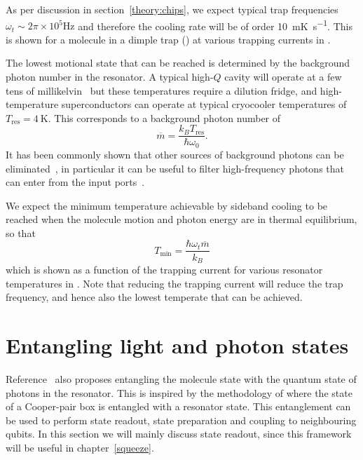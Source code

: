 As per discussion in section~\ref{theory:chips}, we expect typical trap
frequencies $\omega_t\sim 2\pi \times 10^5 \si{\hertz}$ and therefore the
cooling rate will be of order \SI{10}{\milli\kelvin\per\second}. This is shown
for a molecule in a dimple trap () at various trapping currents in
.

The lowest motional state that can be reached is determined by the background
photon number in the resonator. A typical high-$Q$ cavity will operate at a few
tens of millikelvin~\cite{doi:10.1063/1.3010859} but these temperatures require
a dilution fridge, and high-temperature superconductors can operate at typical
cryocooler temperatures of $T_\text{res}=\SI{4}{\kelvin}$. This corresponds
to a background photon number of
%
\begin{equation}
  \overline{m} = \frac{k_B T_\text{res}}{\hbar \omega_0}.
\end{equation}
%
It has been commonly shown that other sources of background photons can be
eliminated~\cite{Wallraff2004}, in particular it can be useful to filter
high-frequency photons that can enter from the input
ports~\cite{doi:10.1063/1.3638063}. 

We expect the minimum temperature achievable by sideband cooling to be reached
when the molecule motion and photon energy are in thermal equilibrium, so that
%
\begin{equation}
  T_\text{min} = \frac{\hbar \omega_t \overline{m}}{k_B}
\end{equation}
%
which is shown as a function of the trapping current for various resonator
temperatures in . Note that reducing the
trapping current will reduce the trap frequency, and hence also the lowest
temperate that can be achieved. 

\section{Entangling light and photon states}

Reference~\cite{Andre2006} also proposes entangling the molecule state with the
quantum state of photons in the resonator. This is inspired by the methodology
of  where the state of a Cooper-pair box is
entangled with a resonator state. This entanglement can be used to perform
state readout, state preparation and coupling to neighbouring qubits. In this
section we will mainly discuss state readout, since this framework will be
useful in chapter~\ref{squeeze}.

